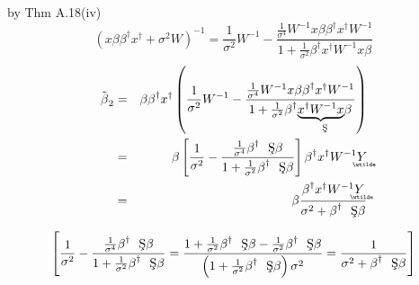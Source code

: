 \documentclass{article}
\begin{document}
by Thm A.18(iv)%
\begin{equation*}
\left( x\beta \beta ^{\dagger }x^{\dagger }+\sigma ^{2}W\right) ^{-1}=\frac{1%
}{\sigma ^{2}}W^{-1}-\frac{\frac{1}{\sigma ^{4}}W^{-1}x\beta \beta ^{\dagger
}x^{\dagger }W^{-1}}{1+\frac{1}{\sigma ^{2}}\beta ^{\dagger }x^{\dagger
}W^{-1}x\beta }
\end{equation*}%
\begin{eqnarray*}
\tilde{\beta}_{2} &=&\beta \beta ^{\dagger }x^{\dagger }\left( \frac{1}{%
\sigma ^{2}}W^{-1}-\frac{\frac{1}{\sigma ^{4}}W^{-1}x\beta \beta ^{\dagger
}x^{\dagger }W^{-1}}{1+\frac{1}{\sigma ^{2}}\beta ^{\dagger }\underset{\text{%
\c{S}}}{\underbrace{x^{\dagger }W^{-1}x}}\beta }\right) \\
&=&\beta \left[ \frac{1}{\sigma ^{2}}-\frac{\frac{1}{\sigma ^{4}}\beta
^{\dagger }\text{\c{S}}\beta }{1+\frac{1}{\sigma ^{2}}\beta ^{\dagger }\text{%
\c{S}}\beta }\right] \beta ^{\dagger }x^{\dagger }W^{-1}%
\underaccent{\wtilde}{Y}
\\
&=&\beta \frac{\beta ^{\dagger }x^{\dagger }W^{-1}%
\underaccent{\wtilde}{Y}%
}{\sigma ^{2}+\beta ^{\dagger }\text{\c{S}}\beta }
\end{eqnarray*}

\begin{equation*}
\left[ \frac{1}{\sigma ^{2}}-\frac{\frac{1}{\sigma ^{4}}\beta ^{\dagger }%
\text{\c{S}}\beta }{1+\frac{1}{\sigma ^{2}}\beta ^{\dagger }\text{\c{S}}%
\beta }=\frac{1+\frac{1}{\sigma ^{2}}\beta ^{\dagger }\text{\c{S}}\beta -%
\frac{1}{\sigma ^{2}}\beta ^{\dagger }\text{\c{S}}\beta }{\left( 1+\frac{1}{%
\sigma ^{2}}\beta ^{\dagger }\text{\c{S}}\beta \right) \sigma ^{2}}=\frac{1}{%
\sigma ^{2}+\beta ^{\dagger }\text{\c{S}}\beta }\right]
\end{equation*}
\end{document}

